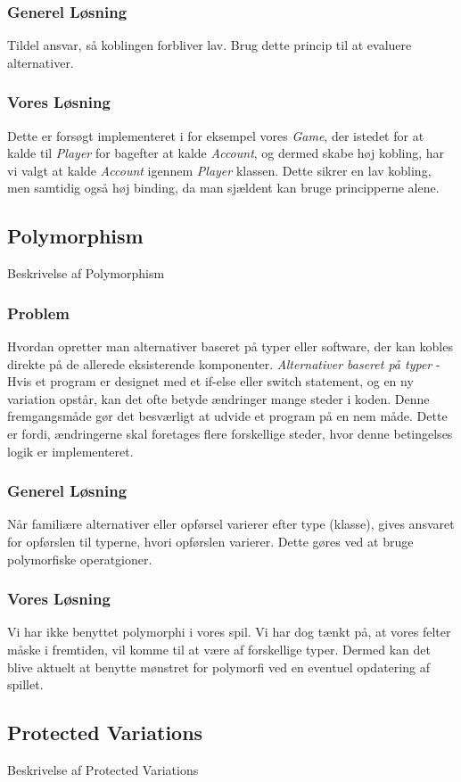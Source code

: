 \subsubsection{Generel Løsning}
Tildel ansvar, så koblingen forbliver lav. Brug dette princip til at evaluere alternativer.
\subsubsection{Vores Løsning}
Dette er forsøgt implementeret i for eksempel vores \textit{Game}, der istedet for at kalde til  \textit{Player} for bagefter at kalde \textit{Account}, og dermed skabe høj kobling, har vi valgt at kalde \textit{Account} igennem \textit{Player} klassen. Dette sikrer en lav kobling, men samtidig også høj binding, da man sjældent kan bruge principperne alene.
\subsection{Polymorphism}
Beskrivelse af Polymorphism
\subsubsection{Problem}
Hvordan opretter man alternativer baseret på typer eller software, der kan kobles direkte på de allerede eksisterende komponenter.
\textit{Alternativer baseret på typer} - Hvis et program er designet med et if-else eller switch statement, og en ny variation opstår, kan det ofte betyde ændringer mange steder i koden. Denne fremgangsmåde gør det besværligt at udvide et program på en nem måde. Dette er fordi, ændringerne skal foretages flere forskellige steder, hvor denne betingelses logik er implementeret.
\subsubsection{Generel Løsning}
Når familiære alternativer eller opførsel varierer efter type (klasse), gives ansvaret for opførslen til typerne, hvori opførslen varierer. Dette gøres ved at bruge polymorfiske operatgioner.
\subsubsection{Vores Løsning}
Vi har ikke benyttet polymorphi i vores spil. Vi har dog tænkt på, at vores felter måske i fremtiden, vil komme til at være af forskellige typer. Dermed kan det blive aktuelt at benytte mønstret for polymorfi ved en eventuel opdatering af spillet.
\subsection{Protected Variations}
Beskrivelse af Protected Variations
